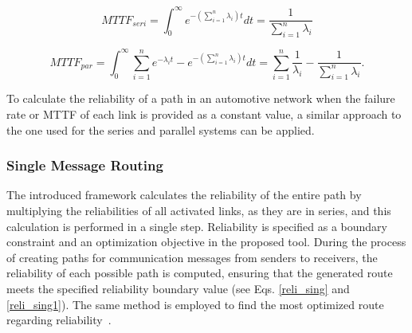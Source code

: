     \begin{equation}
        MTTF_{seri} = \int_0^{\infty} e^{-(\sum_{i=1}^n \lambda_i) t} dt = \frac{1}{\sum_{i=1}^n \lambda_i}
        \label{eq:mttf_seq}
    \end{equation}
    \vspace{5pt}
            
    \begin{equation}
         MTTF_{par} = \int_0^{\infty} \sum_{i=1}^n e^{-\lambda_i t} - e^{-(\sum_{i=1}^n \lambda_i) t} dt
         = \sum_{i=1}^n \frac{1}{\lambda_i} - \frac{1}{\sum_{i=1}^n \lambda_i}.
         \label{mttf_para}
     \end{equation}
    \vspace{3pt}
    
     To calculate the reliability of a path in an automotive network when the failure rate or MTTF of each link is provided as a constant value, a similar approach to the one used for the series and parallel systems can be applied.
     
    \subsubsection{Single Message Routing}
        
        
        The introduced framework calculates the reliability of the entire path by multiplying the reliabilities of all activated links, as they are in series, and this calculation is performed in a single step. Reliability is specified as a boundary constraint and an optimization objective in the proposed tool. During the process of creating paths for communication messages from senders to receivers, the reliability of each possible path is computed, ensuring that the generated route meets the specified reliability boundary value (see Eqs. \eqref{reli_sing} and \eqref{reli_sing1}). The same method is employed to find the most optimized route regarding reliability~\cite{10588416}.
        

